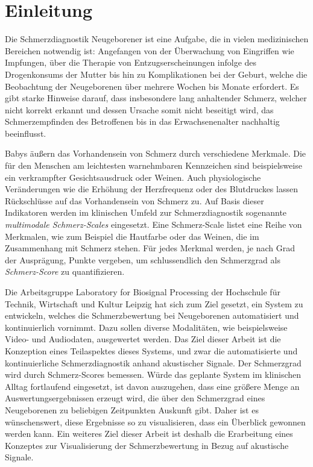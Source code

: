 \chapter{Einleitung}

Die Schmerzdiagnostik Neugeborener ist eine Aufgabe, die in vielen medizinischen Bereichen notwendig ist: Angefangen von der Überwachung von Eingriffen wie Impfungen, über die Therapie von Entzugserscheinungen infolge des Drogenkonsums der Mutter bis hin zu Komplikationen bei der Geburt, welche die Beobachtung der Neugeborenen über mehrere Wochen bis Monate erfordert. Es gibt starke Hinweise darauf, dass insbesondere lang anhaltender Schmerz, welcher nicht korrekt erkannt und dessen Ursache somit nicht beseitigt wird, das Schmerzempfinden des Betroffenen bis in das Erwachsenenalter nachhaltig beeinflusst.\cite[S. 402]{PainAssessment03}

Babys äußern das Vorhandensein von Schmerz durch verschiedene Merkmale. Die für den Menschen am leichtesten warnehmbaren Kennzeichen sind beispielsweise ein verkrampfter Gesichtsausdruck oder Weinen. Auch physiologische Veränderungen wie die Erhöhung der Herzfrequenz oder des Blutdruckes lassen Rückschlüsse auf das Vorhandensein von Schmerz zu.\cite[S. 440]{PainAssessment01} Auf Basis dieser Indikatoren werden im klinischen Umfeld zur Schmerzdiagnostik sogenannte \emph{multimodale Schmerz-Scales} eingesetzt. Eine Schmerz-Scale listet eine Reihe von Merkmalen, wie zum Beispiel die Hautfarbe oder das Weinen, die im Zusammenhang mit Schmerz stehen. Für jedes Merkmal werden, je nach Grad der Ausprägung, Punkte vergeben, um schlussendlich den Schmerzgrad als \emph{Schmerz-Score} zu quantifizieren.\cite[S. 406]{PainAssessment03}

Die Arbeitsgruppe \glqq Laboratory for Biosignal Processing\grqq{} der Hochschule für Technik, Wirtschaft und Kultur Leipzig hat sich zum Ziel gesetzt, ein System zu entwickeln, welches die Schmerzbewertung bei Neugeborenen automatisiert und kontinuierlich vornimmt. Dazu sollen diverse Modalitäten, wie beispielsweise Video- und Audiodaten, ausgewertet werden. Das Ziel dieser Arbeit ist die Konzeption eines Teilaspektes dieses Systems, und zwar die automatisierte und kontinuierliche Schmerzdiagnostik anhand akustischer Signale. Der Schmerzgrad wird durch Schmerz-Scores bemessen. Würde das geplante System im klinischen Alltag fortlaufend eingesetzt, ist davon auszugehen, dass eine größere Menge an Auswertungsergebnissen erzeugt wird, die über den Schmerzgrad eines Neugeborenen zu beliebigen Zeitpunkten Auskunft gibt. Daher ist es wünschenswert, diese Ergebnisse so zu visualisieren, dass ein Überblick gewonnen werden kann. Ein weiteres Ziel dieser Arbeit ist deshalb die Erarbeitung eines Konzeptes zur Visualisierung der Schmerzbewertung in Bezug auf akustische Signale.

